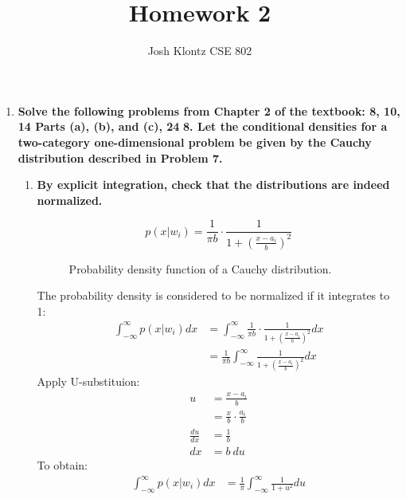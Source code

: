 \documentclass[12pt]{article}
\begin{document}
 
\title{Homework 2}
\author{Josh Klontz
CSE 802}
 
\maketitle

\begin{enumerate}
\item \textbf{Solve the following problems from Chapter 2 of the textbook: 8, 10, 14 Parts (a), (b), and (c), 24}
  \subitem \textbf{8. Let the conditional densities for a two-category one-dimensional problem be given by the Cauchy distribution described in Problem 7.}
  \begin{enumerate}
  \item \textbf{By explicit integration, check that the distributions are indeed normalized.}
    \begin{figure}[H]
    \begin{equation}
      p(x|w_i) = \frac{1}{\pi b} \cdot \frac{1}{1 + (\frac{x-a_i}{b})^2}
    \end{equation}
    \caption{Probability density function of a Cauchy distribution.}
    \end{figure}
    The probability density is considered to be normalized if it integrates to 1:
    \begin{equation}
    \begin{split}
      \int_{-\infty}^{\infty} p(x|w_i) dx& = \int_{-\infty}^{\infty} \frac{1}{\pi b} \cdot \frac{1}{1 + (\frac{x-a_i}{b})^2} dx \\
      & = \frac{1}{\pi b} \int_{-\infty}^{\infty} \frac{1}{1 + (\frac{x-a_i}{b})^2} dx
    \end{split}
    \end{equation}
    Apply U-substituion:
    \begin{equation}
    \begin{split}
      u& = \frac{x-a_i}{b} \\
      & = \frac{x}{b} \cdot \frac{a_i}{b} \\
    \frac{du}{dx}& = \frac{1}{b} \\
    dx& = b\ du
    \end{split}
    \end{equation}
    To obtain:
    \begin{equation}
    \begin{split}
      \int_{-\infty}^{\infty} p(x|w_i) dx& = \frac{1}{\pi} \int_{-\infty}^{\infty} \frac{1}{1 + u^2} du \\

\end{split}
\end{equation}
\end{enumerate}
\end{enumerate}
\end{document}
